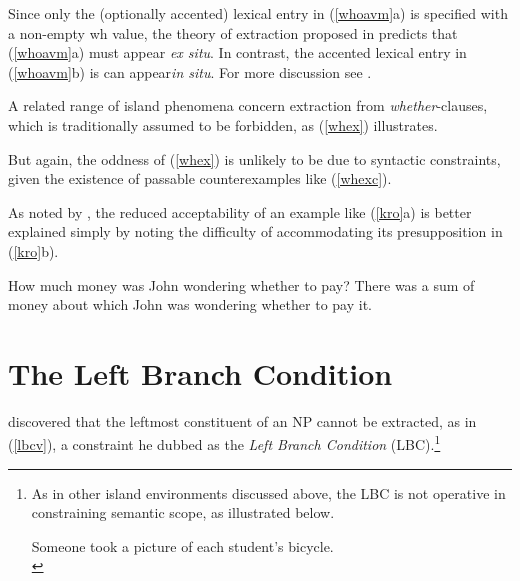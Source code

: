 \documentclass[output=paper
                ,modfonts
                ,nonflat
	        ,collection
	        ,collectionchapter
	        ,collectiontoclongg
 	        ,biblatex
                ,babelshorthands
                ,newtxmath
                ,draftmode
                ,colorlinks, citecolor=brown
]{./langsci/langscibook}
\begin{document}
\zl

Since only the (optionally accented) lexical entry in (\ref{whoavm}a) is specified with a 
non-empty {\sc wh} value, the theory of  extraction proposed in \citet{ginzsag} predicts 
that (\ref{whoavm}a) must appear \emph{ex situ}.  In contrast, the accented lexical entry in
 (\ref{whoavm}b) is can  appear\emph{in situ}. For more discussion see  \citet[261]{levhubook}.

A related range of island phenomena concern extraction from \emph{whether}-clauses, 
which is traditionally assumed to be forbidden, as (\ref{whex}) illustrates.

\eal \label{whex}
\zl 

\noindent
But again, the oddness of (\ref{whex})  is unlikely to be due to syntactic constraints,
given the existence of passable counterexamples like (\ref{whexc}).

\eal \label{whexc}
\zl

As noted by \citet{kroch89}, the reduced acceptability of an example like (\ref{kro}a) is better explained simply
by noting the difficulty of accommodating its presupposition in (\ref{kro}b).


\eal \label{kro}
\ex How much money was John wondering whether to pay?
\ex There was a sum of money about which John was wondering whether
to pay it.
\zl


\section{The Left Branch Condition}

\citet{Ross67} discovered that the leftmost constituent of an NP cannot be extracted, 
as in  (\ref{lbcv}), a constraint he dubbed as the \emph{Left Branch Condition} (LBC).\footnote{As in other island environments discussed above, the LBC is not operative in constraining semantic scope, as illustrated below.

\ea
Someone took a picture of each student's bicycle.\\
\citep[303]{MRS}
\zlast}
 
\end{document}
